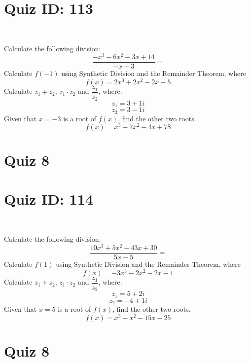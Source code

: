 \documentclass{exam}
\begin{document}
\section*{Quiz ID: 113}
\vspace{0.5cm}\
\vspace{1cm}\
\begin{questions}
\question Calculate the following division:\[\dfrac{
-x^3 - 6x^2 - 3x + 14}{
-x - 3}=\] \makeemptybox{\stretch{2}}
\question Calculate $f(-1)$ using Synthetic Division and the Remainder Theorem, where\[f(x) = 
2x^3 + 2x^2 - 2x - 5\]
\newpage\question Calculate $z_1+z_2$, $z_1\cdot z_2$ and $\dfrac{z_1}{z_2}$, where:\[z_1=3+1\mathit{i}\]\[z_2=3-1\mathit{i}\]
\question Given that $x=-3$ is a root of $f(x)$, find the other two roots.\[f(x)=
x^3 - 7x^2 - 4x + 78\]\makeemptybox{\stretch{1}}
\end{questions}\newpage
\newpage
\section*{Quiz 8}
\section*{Quiz ID: 114}
\vspace{0.5cm}\
\vspace{1cm}\
\begin{questions}
\question Calculate the following division:\[\dfrac{
10x^3 + 5x^2 - 43x + 30}{
5x - 5}=\] 
\question Calculate $f(1)$ using Synthetic Division and the Remainder Theorem, where\[f(x) = 
-3x^3 - 2x^2 - 2x - 1\]
\newpage\question Calculate $z_1+z_2$, $z_1\cdot z_2$ and $\dfrac{z_1}{z_2}$, where:\[z_1=5+2\mathit{i}\]\[z_2=-4+1\mathit{i}\]\makeemptybox{\stretch{1}}
\question Given that $x=5$ is a root of $f(x)$, find the other two roots.\[f(x)=
x^3 - x^2 - 15x - 25\]\makeemptybox{\stretch{1}}
\end{questions}\newpage
\newpage
\section*{Quiz 8}
\end{document}
